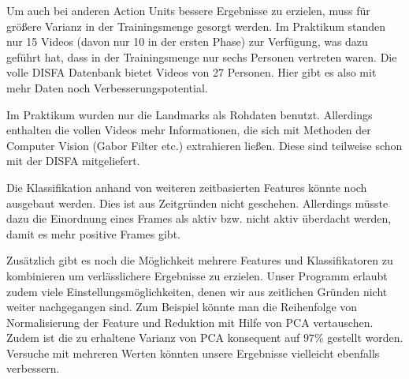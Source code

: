 Um auch bei anderen Action Units bessere Ergebnisse zu erzielen, muss für
größere Varianz in der Trainingsmenge gesorgt werden. Im Praktikum standen nur
15 Videos (davon nur 10 in der ersten Phase) zur Verfügung, was dazu geführt
hat, dass in der Trainingsmenge nur sechs Personen vertreten waren. Die volle
DISFA Datenbank bietet Videos von 27 Personen. Hier gibt es also mit mehr Daten
noch Verbesserungspotential.

Im Praktikum wurden nur die Landmarks als Rohdaten benutzt. Allerdings enthalten
die vollen Videos mehr Informationen, die sich mit Methoden der Computer Vision
(Gabor Filter etc.) extrahieren ließen. Diese sind teilweise schon mit der DISFA mitgeliefert.

Die Klassifikation anhand von weiteren zeitbasierten Features könnte noch ausgebaut
werden. Dies ist aus Zeitgründen nicht geschehen. Allerdings müsste dazu die
Einordnung eines Frames als aktiv bzw. nicht aktiv überdacht werden, damit es
mehr positive Frames gibt.

Zusätzlich gibt es noch die Möglichkeit mehrere Features und Klassifikatoren zu kombinieren um verlässlichere Ergebnisse zu erzielen. Unser Programm erlaubt zudem viele Einstellungsmöglichkeiten, denen wir aus zeitlichen Gründen nicht weiter nachgegangen sind. Zum Beispiel könnte man die Reihenfolge von Normalisierung der Feature und Reduktion mit Hilfe von PCA vertauschen. Zudem ist die zu erhaltene Varianz von PCA konsequent  auf $97\%$ gestellt worden. Versuche mit mehreren Werten könnten unsere Ergebnisse vielleicht ebenfalls verbessern.

